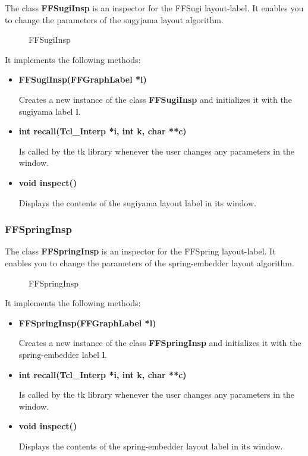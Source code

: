 The class {\bf FFSugiInsp} is an inspector for the FFSugi
layout-label. It enables you to change the parameters of the sugyjama
layout algorithm.

\begin{figure}[htb]
\caption{FFSugiInsp}
\end{figure}
\clearpage

It implements the following methods:

\begin{itemize}

\item{\bf FFSugiInsp(FFGraphLabel *l)}

Creates a new instance of the class {\bf FFSugiInsp} and initializes
it with the sugiyama label {\bf l}.

\item{\bf int recall(Tcl\_Interp *i, int k, char **c)}

Is called by the tk library whenever the user changes any parameters
in the window.

\item{\bf void inspect()}

Displays the contents of the sugiyama layout label in its window.

\end{itemize}

\subsubsection{FFSpringInsp}

The class {\bf FFSpringInsp} is an inspector for the FFSpring
layout-label. It enables you to change the parameters of the
spring-embedder layout algorithm.

\begin{figure}[htb]
\mbox{}
\caption{FFSpringInsp}
\end{figure}
\clearpage

It implements the following methods:

\begin{itemize}

\item{\bf FFSpringInsp(FFGraphLabel *l)}

Creates a new instance of the class {\bf FFSpringInsp} and initializes
it with the spring-embedder label {\bf l}.

\item{\bf int recall(Tcl\_Interp *i, int k, char **c)}

Is called by the tk library whenever the user changes any parameters
in the window.

\item{\bf void inspect()}

Displays the contents of the spring-embedder layout label in its
window.

\end{itemize}


